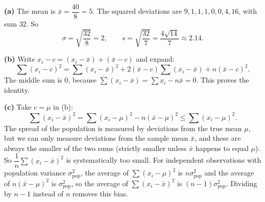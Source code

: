 \textbf{(a)} The mean is $\bar x=\dfrac{40}{8}=5$. The squared deviations are $9,1,1,1,0,0,4,16$, with sum $32$. So
\[
\sigma=\sqrt{\dfrac{32}{8}}=\boxed{2},\qquad s=\sqrt{\dfrac{32}{7}}=\boxed{\dfrac{4\sqrt{14}}{7}}\approx2.14 .
\]

\textbf{(b)} Write $x_i-c=(x_i-\bar x)+(\bar x-c)$ and expand:
\[
\sum(x_i-c)^2=\sum(x_i-\bar x)^2+2(\bar x-c)\sum(x_i-\bar x)+n(\bar x-c)^2 .
\]
The middle sum is $0$, because $\sum(x_i-\bar x)=\sum x_i-n\bar x=0$. This proves the identity.

\textbf{(c)} Take $c=\mu$ in (b):
\[
\sum(x_i-\bar x)^2=\sum(x_i-\mu)^2-n(\bar x-\mu)^2\le\sum(x_i-\mu)^2 .
\]
The spread of the population is measured by deviations from the true mean $\mu$, but we can only measure deviations from the sample mean $\bar x$, and these are always the smaller of the two sums (strictly smaller unless $\bar x$ happens to equal $\mu$). So $\dfrac{1}{n}\sum(x_i-\bar x)^2$ is systematically too small. For independent observations with population variance $\sigma_{\text{pop}}^2$, the average of $\sum(x_i-\mu)^2$ is $n\sigma_{\text{pop}}^2$ and the average of $n(\bar x-\mu)^2$ is $\sigma_{\text{pop}}^2$, so the average of $\sum(x_i-\bar x)^2$ is $(n-1)\sigma_{\text{pop}}^2$. Dividing by $n-1$ instead of $n$ removes this bias.
